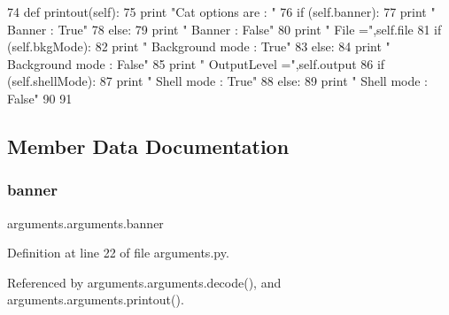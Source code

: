 \begin{DoxyCode}
74     \textcolor{keyword}{def }printout(self):
75         \textcolor{keywordflow}{print} \textcolor{stringliteral}{"Cat options are : "}
76         \textcolor{keywordflow}{if} (self.banner):
77             \textcolor{keywordflow}{print} \textcolor{stringliteral}{"   Banner          : True"}
78         \textcolor{keywordflow}{else}:
79             \textcolor{keywordflow}{print} \textcolor{stringliteral}{"   Banner          : False"}
80         \textcolor{keywordflow}{print} \textcolor{stringliteral}{"   File            ="},self.file
81         \textcolor{keywordflow}{if} (self.bkgMode):
82             \textcolor{keywordflow}{print} \textcolor{stringliteral}{"   Background mode : True"}
83         \textcolor{keywordflow}{else}:
84             \textcolor{keywordflow}{print} \textcolor{stringliteral}{"   Background mode : False"}
85         \textcolor{keywordflow}{print} \textcolor{stringliteral}{"   OutputLevel     ="},self.output
86         \textcolor{keywordflow}{if} (self.shellMode):
87             \textcolor{keywordflow}{print} \textcolor{stringliteral}{"   Shell mode      : True"}
88         \textcolor{keywordflow}{else}:
89             \textcolor{keywordflow}{print} \textcolor{stringliteral}{"   Shell mode      : False"}
90 
91 
\end{DoxyCode}


\subsection{Member Data Documentation}
\mbox{\label{classarguments_1_1arguments_acb4e4112cd5350ff6a02489afe2ff105}} 
\subsubsection{\texorpdfstring{banner}{banner}}
{\footnotesize\ttfamily arguments.\+arguments.\+banner}



Definition at line 22 of file arguments.\+py.



Referenced by arguments.\+arguments.\+decode(), and arguments.\+arguments.\+printout().

\mbox{\label{classarguments_1_1arguments_a0682389c6c09efe728929cb9e32fb329}} 
